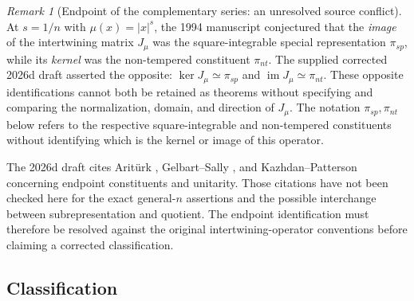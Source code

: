 \documentclass[12pt,letterpaper]{article}
\theoremstyle{definition}
\theoremstyle{remark}
\newtheorem{remark}[theorem]{Remark}
\begin{document}
\begin{remark}[Endpoint of the complementary series: an unresolved source conflict]\label{prop:special}
At $s=1/n$ with $\mu(x)=|x|^s$, the 1994 manuscript
\cite{Jo94} conjectured that the \emph{image} of the intertwining
matrix $J_\mu$ was the square-integrable special representation
$\pi_{sp}$, while its \emph{kernel} was the non-tempered constituent
$\pi_{nt}$.  The supplied corrected 2026d draft asserted the opposite:
$\ker J_\mu\simeq\pi_{sp}$ and
$\operatorname{im}J_\mu\simeq\pi_{nt}$.  These opposite identifications
cannot both be retained as theorems without specifying and comparing
the normalization, domain, and direction of $J_\mu$.  The notation
$\pi_{sp},\pi_{nt}$ below refers to the respective square-integrable
and non-tempered constituents without identifying which is the
kernel or image of this operator.

The 2026d draft cites Arit\"urk \cite{Ar80}, Gelbart--Sally
\cite{GS75}, and Kazhdan--Patterson \cite{KP84} concerning endpoint
constituents and unitarity.  Those citations have not been checked here
for the exact general-$n$ assertions and the possible interchange
between subrepresentation and quotient.  The endpoint identification
must therefore be resolved against the original intertwining-operator
conventions before claiming a corrected classification.
\end{remark}

\subsection{Classification}
\end{document}
